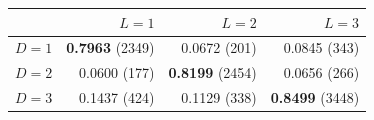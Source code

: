 \begin{tabular}{lrrr}
\toprule
 & $L=1$ & $L=2$ & $L=3$ \\
\midrule
$D=1$ & \textbf{0.7963} (2349) & 0.0672 (201) & 0.0845 (343) \\
$D=2$ & 0.0600 (177) & \textbf{0.8199} (2454) & 0.0656 (266) \\
$D=3$ & 0.1437 (424) & 0.1129 (338) & \textbf{0.8499} (3448) \\
\bottomrule
\end{tabular}
